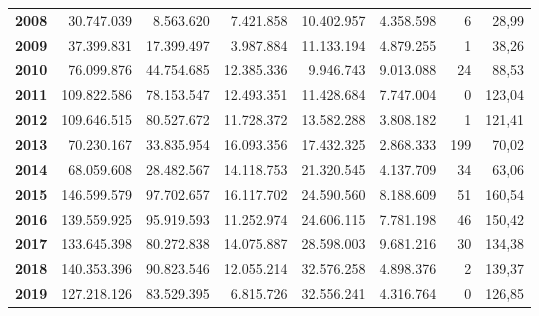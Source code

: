 \begin{table}[h!]
\begin{adjustbox}{width=1.5\textwidth, center}
\begin{tabular}{|l|r|r|r|r|r|r|r|}
        \textbf{2008}       & 30.747.039            & 8.563.620             & 7.421.858                 & 10.402.957            & 4.358.598                 & 6             & 28,99         \\
        \textbf{2009}       & 37.399.831            & 17.399.497            & 3.987.884                 & 11.133.194            & 4.879.255                 & 1             & 38,26         \\
        \textbf{2010}       & 76.099.876            & 44.754.685            & 12.385.336                & 9.946.743             & 9.013.088                 & 24            & 88,53         \\
        \textbf{2011}       & 109.822.586           & 78.153.547            & 12.493.351                & 11.428.684            & 7.747.004                 & 0             & 123,04        \\
        \midrule
        \textbf{2012}       & 109.646.515           & 80.527.672            & 11.728.372                & 13.582.288            & 3.808.182                 & 1             & 121,41        \\
        \textbf{2013}       & 70.230.167            & 33.835.954            & 16.093.356                & 17.432.325            & 2.868.333                 & 199           & 70,02         \\
        \textbf{2014}       & 68.059.608            & 28.482.567            & 14.118.753                & 21.320.545            & 4.137.709                 & 34            & 63,06         \\
        \textbf{2015}       & 146.599.579           & 97.702.657            & 16.117.702                & 24.590.560            & 8.188.609                 & 51            & 160,54        \\
        \textbf{2016}       & 139.559.925           & 95.919.593            & 11.252.974                & 24.606.115            & 7.781.198                 & 46            & 150,42        \\
        \textbf{2017}       & 133.645.398           & 80.272.838            & 14.075.887                & 28.598.003            & 9.681.216                 & 30            & 134,38        \\
        \midrule
        \textbf{2018}       & 140.353.396           & 90.823.546            & 12.055.214                & 32.576.258            & 4.898.376                 & 2             & 139,37        \\
        \textbf{2019}       & 127.218.126           & 83.529.395            & 6.815.726                 & 32.556.241            & 4.316.764                 & 0             & 126,85        \\

\end{tabular}
\end{adjustbox}
\end{table}
